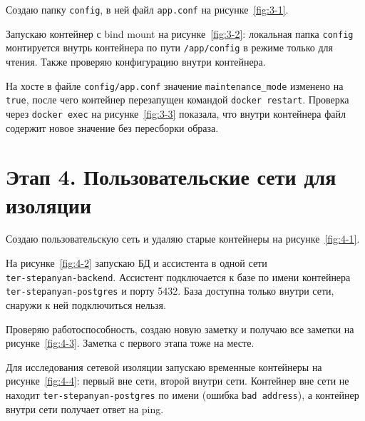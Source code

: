 Создаю папку \texttt{config}, в ней файл \texttt{app.conf} на
рисунке~\ref{fig:3-1}.


Запускаю контейнер с bind mount на рисунке~\ref{fig:3-2}: локальная папка
\texttt{config} монтируется внутрь контейнера по пути \texttt{/app/config}
в режиме только для чтения. Также проверяю конфигурацию внутри контейнера.


На хосте в файле \texttt{config/app.conf} значение
\texttt{maintenance\_mode} изменено на \texttt{true}, после чего контейнер
перезапущен командой \texttt{docker restart}. Проверка через
\texttt{docker exec} на рисунке~\ref{fig:3-3} показала, что внутри
контейнера файл содержит новое значение без пересборки образа.


\section{Этап 4. Пользовательские сети для изоляции}

Создаю пользовательскую сеть и удаляю старые контейнеры на
рисунке~\ref{fig:4-1}.


На рисунке~\ref{fig:4-2} запускаю БД и ассистента в одной сети \\
\texttt{ter-stepanyan-backend}. Ассистент подключается к базе по имени
контейнера \texttt{ter-stepanyan-postgres} и порту 5432. База доступна
только внутри сети, снаружи к ней подключиться нельзя.


Проверяю работоспособность, создаю новую заметку и получаю все заметки на
рисунке~\ref{fig:4-3}. Заметка с первого этапа тоже на месте.


Для исследования сетевой изоляции запускаю временные контейнеры на
рисунке~\ref{fig:4-4}: первый вне сети, второй внутри сети. Контейнер вне
сети не находит \texttt{ter-stepanyan-postgres} по имени (ошибка
\texttt{bad address}), а контейнер внутри сети получает ответ на ping.

